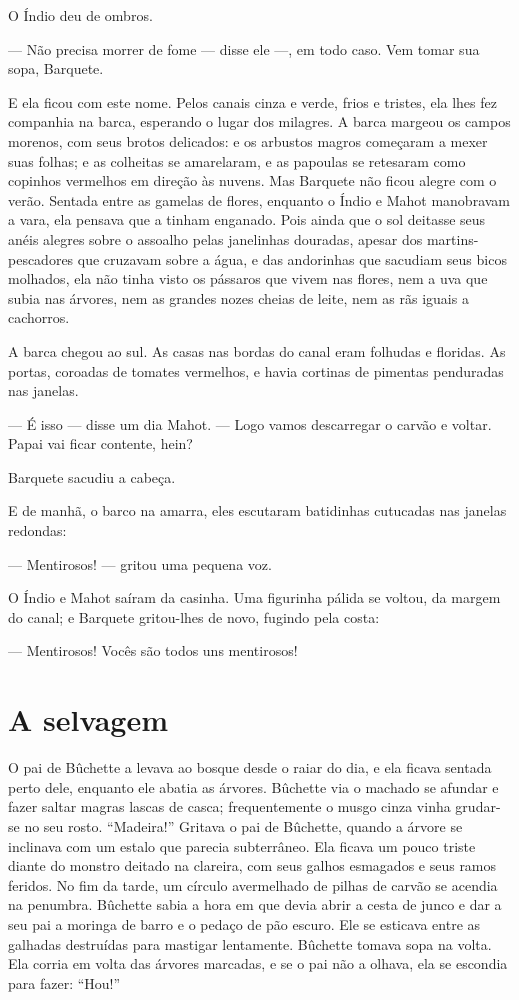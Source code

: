 O Índio deu de ombros.

--- Não precisa morrer de fome --- disse ele ---, em todo caso.  Vem tomar sua
sopa, Barquete.

E ela ficou com este nome. Pelos canais cinza e verde, frios e tristes,
ela lhes fez companhia na barca, esperando o lugar dos milagres. A barca
margeou os campos morenos, com seus brotos delicados: e os arbustos magros
começaram a mexer suas folhas; e as colheitas se amarelaram, e as
papoulas se retesaram como copinhos vermelhos em direção às nuvens. Mas
Barquete não ficou alegre com o verão. Sentada entre as gamelas de flores,
enquanto o Índio e Mahot manobravam a vara, ela pensava que a tinham
enganado. Pois ainda que o sol deitasse seus anéis alegres sobre o
assoalho pelas janelinhas douradas, apesar dos martins-pescadores que
cruzavam sobre a água, e das andorinhas que sacudiam seus bicos molhados,
ela não tinha visto os pássaros que vivem nas flores, nem a uva que subia
nas árvores, nem as grandes nozes cheias de leite, nem as rãs iguais
a cachorros.

A barca chegou ao sul. As casas nas bordas do canal eram folhudas e
floridas. As portas, coroadas de tomates vermelhos, e havia cortinas de
pimentas penduradas nas janelas.

--- É isso --- disse um dia Mahot. --- Logo vamos descarregar o carvão e
voltar. Papai vai ficar contente, hein?

Barquete sacudiu a cabeça.

E de manhã, o barco na amarra, eles escutaram batidinhas cutucadas nas
janelas redondas:

--- Mentirosos! --- gritou uma pequena voz.

O Índio e Mahot saíram da casinha. Uma figurinha pálida se voltou,
da margem do canal; e Barquete gritou-lhes de novo, fugindo pela
costa:

--- Mentirosos! Vocês são todos uns mentirosos!

\section*{A selvagem}

O pai de Bûchette a levava ao bosque desde o raiar do dia, e ela ficava
sentada perto dele, enquanto ele abatia as árvores. Bûchette via o machado
se afundar e fazer saltar magras lascas de casca; frequentemente o musgo
cinza vinha grudar-se no seu rosto. “Madeira!” Gritava o pai de Bûchette,
quando a árvore se inclinava com um estalo que parecia subterrâneo. Ela
ficava um pouco triste diante do monstro deitado na clareira, com seus
galhos esmagados e seus ramos feridos. No fim da tarde, um círculo avermelhado de
pilhas de carvão se acendia na penumbra. Bûchette sabia a hora em que
devia abrir a cesta de junco e dar a seu pai a moringa de barro e o pedaço
de pão escuro. Ele se esticava entre as galhadas destruídas para mastigar
lentamente. Bûchette tomava sopa na volta. Ela corria em volta das árvores
marcadas, e se o pai não a olhava, ela se escondia para fazer: “Hou!”

